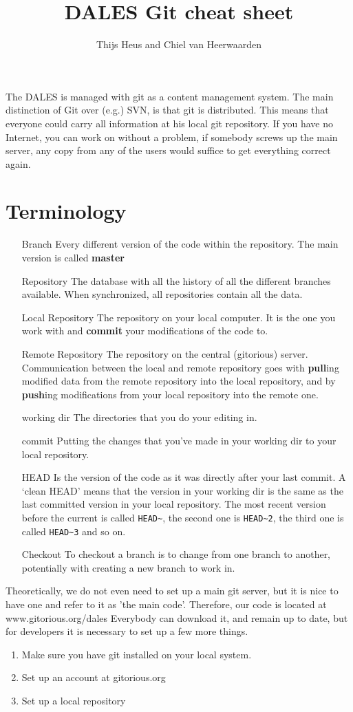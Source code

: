 \documentclass[a4paper,10pt]{article}
\title{DALES Git cheat sheet}
\author{Thijs Heus and Chiel van Heerwaarden}
\begin{document}
\maketitle
The DALES is managed with git as a content management system. The main distinction of Git over (e.g.) SVN, is that git is distributed. This means that everyone could carry all information at his local git repository. If you have no Internet, you can work on without a problem, if somebody screws up the main server, any copy from any of the users would suffice to get everything correct again.
\section{Terminology}
\begin{itemize}
\item[Branch] Every different version of the code within the repository. The main version is called \textbf{master}
\item[Repository] The database with all the history of all the different branches available. When synchronized, all repositories contain all the data.
\item[Local Repository] The repository on your local computer. It is the one you work with and \textbf{commit} your modifications of the code to.
\item[Remote Repository] The repository on the central (gitorious) server. Communication between the local and remote repository goes with \textbf{pull}ing modified data from the remote repository into the local repository, and by \textbf{push}ing modifications from your local repository into the remote one.
\item [working dir] The directories that you do your editing in.
\item[commit] Putting the changes that you've made in your working dir to your local repository.
\item [HEAD] Is the version of the code as it was directly after your last commit. A `clean HEAD' means that the version in your working dir is the same as the last committed version in your local repository. The most recent version before the current is called \verb|HEAD~|, the second one is \verb|HEAD~2|, the third one is called \verb|HEAD~3| and so on.
\item[Checkout] To checkout a branch is to change from one branch to another, potentially with creating a new branch to work in.
\end{itemize}


Theoretically, we do not even need to set up a main git server, but it is nice to have one and refer to it as 'the main code'. Therefore, our code is located at www.gitorious.org/dales
Everybody can download it, and remain up to date, but for developers it is necessary to set up a few more things.
\begin{enumerate}
 \item Make sure you have git installed on your local system.
\item Set up an account at gitorious.org
\item Set up a local repository
\end{enumerate}
\end{document}
